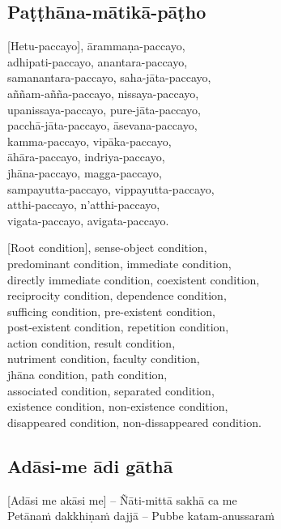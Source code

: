 \subsection{Paṭṭhāna-mātikā-pāṭho}
\label{patthana-matika-patho}
[Hetu-paccayo], ārammaṇa-paccayo,\\
adhipati-paccayo, anantara-paccayo,\\
samanantara-paccayo, saha-jāta-paccayo,\\
aññam-añña-paccayo, nissaya-paccayo,\\
upanissaya-paccayo, pure-jāta-paccayo,\\
pacchā-jāta-paccayo, āsevana-paccayo,\\
kamma-paccayo, vipāka-paccayo,\\
āhāra-paccayo, indriya-paccayo,\\
jhāna-paccayo, magga-paccayo,\\
sampayutta-paccayo, vippayutta-paccayo,\\
atthi-paccayo, n'atthi-paccayo,\\
vigata-paccayo, avigata-paccayo.

\begin{english}
  [Root condition], sense-object condition,\\
  predominant condition, immediate condition,\\
  directly immediate condition, coexistent condition,\\
  reciprocity condition, dependence condition,\\
  sufficing condition, pre-existent condition,\\
  post-existent condition, repetition condition,\\
  action condition, result condition,\\
  nutriment condition, faculty condition,\\
  jhāna condition, path condition,\\
  associated condition, separated condition,\\
  existence condition, non-existence condition,\\
  disappeared condition, non-dissappeared condition.
\end{english}

\suttaRef{[Dhs A]}

\subsection{Adāsi-me ādi gāthā}
\label{adasi-me-adi-gatha}
[Adāsi me akāsi me] – Ñāti-mittā sakhā ca me\\
Petānaṁ dakkhiṇaṁ dajjā – Pubbe katam-anussaraṁ

